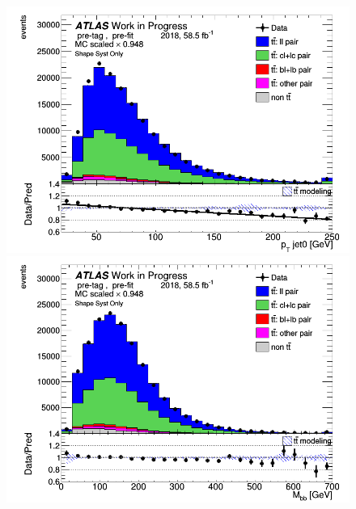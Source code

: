 \documentclass[letterpaper,12pt]{article}
\begin{document}
\begin{figure}[H]
\begin{minipage}[b]{.45\textwidth}
\end{minipage}\hfill
\begin{minipage}[b]{.45\textwidth}
\centering
\includegraphics[width=1\textwidth]{Distribution_March_highpT/DataMC_J0_pt.png}
\end{minipage}\hfill
\begin{minipage}[b]{.45\textwidth}
\centering
\includegraphics[width=1\textwidth]{Distribution_March_highpT/DataMC_Mbb.png}
\end{minipage}\hfill
\begin{minipage}[b]{.45\textwidth}
\centering

\end{minipage}
\end{figure}
\end{document}
